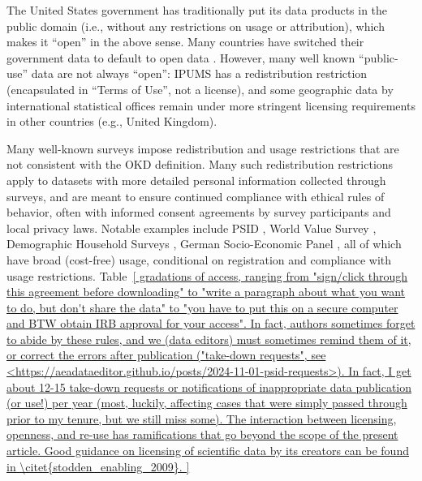 \documentclass{article}
\begin{document}
The United States government has traditionally put its data products in the public domain (i.e., without any restrictions on usage or attribution), which makes it ``open'' in the above sense. Many countries have switched their government data to default to open data \parencite{statistics_canada_statistics_2012,uk_government_open_2014}. However, many well known ``public-use'' data are not always ``open'': IPUMS has a redistribution restriction (encapsulated in ``Terms of Use'', not a license), and some geographic data by international statistical offices remain under more stringent licensing requirements in other countries (e.g., United Kingdom). 

Many well-known surveys impose redistribution and usage restrictions that are not consistent with the OKD definition. Many such redistribution restrictions apply to datasets with more detailed personal information collected through surveys, and are meant to ensure continued compliance with ethical rules of behavior, often with informed consent agreements by survey participants and local privacy laws. Notable examples include  PSID \parencite{institute_for_social_research_panel_2024}, World Value Survey \parencite{haerpfer_world_2024}, Demographic Household Surveys \parencite{dhs_program_demographic_2024}, German Socio-Economic Panel \parencite{goebel_german_2019,goebel_socio-economic_2024}, all of which have broad (cost-free) usage, conditional on registration and compliance with usage restrictions. Table~\ref{

gradations of access, ranging from "sign/click through this agreement before downloading"  to "write a paragraph about what you want to do, but don't share the data"  to "you have to put this on a secure computer and BTW obtain IRB approval for your access". In fact, authors sometimes forget to abide by these rules, and we (data editors) must sometimes remind them of it, or correct the errors after publication ("take-down requests", see <https://aeadataeditor.github.io/posts/2024-11-01-psid-requests>). In fact, I get about 12-15 take-down requests or notifications of inappropriate data publication (or use!) per year (most, luckily, affecting cases that were simply passed through prior to my tenure, but we still miss some).


The interaction between licensing, openness, and re-use has ramifications that go beyond the scope of the present article. Good guidance on licensing of scientific data by its creators can be found in \citet{stodden_enabling_2009}.


}
\end{document}
